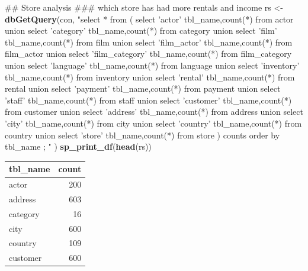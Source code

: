 \documentclass[]{book}
\newenvironment{Shaded}{\begin{snugshade}}{\end{snugshade}}
\newcommand{\KeywordTok}[1]{\textcolor[rgb]{0.13,0.29,0.53}{\textbf{#1}}}
\newcommand{\NormalTok}[1]{#1}
\newcommand{\StringTok}[1]{\textcolor[rgb]{0.31,0.60,0.02}{#1}}
\theoremstyle{definition}
\theoremstyle{definition}
\theoremstyle{definition}
\theoremstyle{remark}
\begin{document}
\begin{Shaded}
\begin{Highlighting}[]
\NormalTok{## Store analysis}
\NormalTok{### which store has had more rentals and income}
\NormalTok{rs <-}\StringTok{ }\KeywordTok{dbGetQuery}\NormalTok{(con,}
                \StringTok{"select *}
\StringTok{                 from (      select 'actor' tbl_name,count(*) from actor }
\StringTok{                       union select 'category' tbl_name,count(*) from category}
\StringTok{                       union select 'film' tbl_name,count(*) from film}
\StringTok{                       union select 'film_actor' tbl_name,count(*) from film_actor}
\StringTok{                       union select 'film_category' tbl_name,count(*) from film_category}
\StringTok{                       union select 'language' tbl_name,count(*) from language}
\StringTok{                       union select 'inventory' tbl_name,count(*) from inventory}
\StringTok{                       union select 'rental' tbl_name,count(*) from rental}
\StringTok{                       union select 'payment' tbl_name,count(*) from payment}
\StringTok{                       union select 'staff' tbl_name,count(*) from staff}
\StringTok{                       union select 'customer' tbl_name,count(*) from customer}
\StringTok{                       union select 'address' tbl_name,count(*) from address}
\StringTok{                       union select 'city' tbl_name,count(*) from city}
\StringTok{                       union select 'country' tbl_name,count(*) from country}
\StringTok{                       union select 'store' tbl_name,count(*) from store}
\StringTok{                       ) counts}
\StringTok{                  order by tbl_name}
\StringTok{                 ;}
\StringTok{                "}
\NormalTok{                )}
\KeywordTok{sp_print_df}\NormalTok{(}\KeywordTok{head}\NormalTok{(rs))}
\end{Highlighting}
\end{Shaded}

\begin{tabular}{l|r}
\hline
tbl\_name & count\\
\hline
actor & 200\\
\hline
address & 603\\
\hline
category & 16\\
\hline
city & 600\\
\hline
country & 109\\
\hline
customer & 600\\
\hline
\end{tabular}
\end{document}
